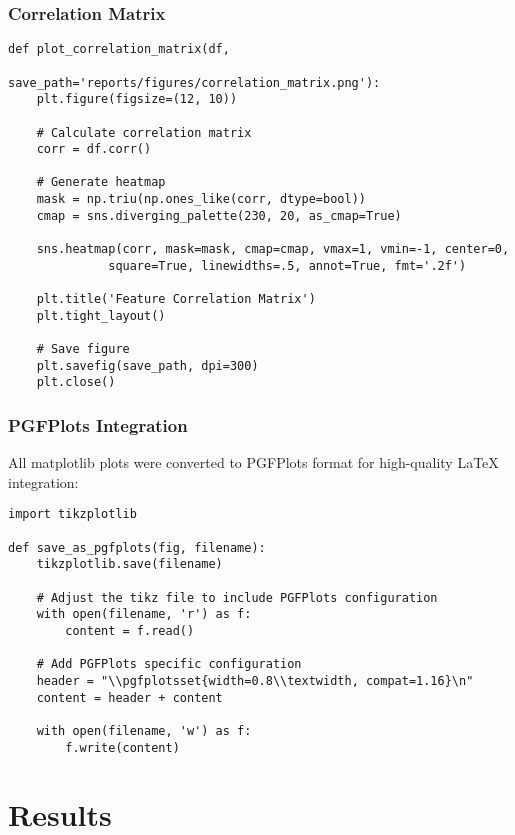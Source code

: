 \documentclass[12pt]{article}
\begin{document}
\subsection{Correlation Matrix}
\label{subsec:correlation_matrix}

\begin{verbatim}
def plot_correlation_matrix(df, 
                          save_path='reports/figures/correlation_matrix.png'):
    plt.figure(figsize=(12, 10))
    
    # Calculate correlation matrix
    corr = df.corr()
    
    # Generate heatmap
    mask = np.triu(np.ones_like(corr, dtype=bool))
    cmap = sns.diverging_palette(230, 20, as_cmap=True)
    
    sns.heatmap(corr, mask=mask, cmap=cmap, vmax=1, vmin=-1, center=0,
              square=True, linewidths=.5, annot=True, fmt='.2f')
    
    plt.title('Feature Correlation Matrix')
    plt.tight_layout()
    
    # Save figure
    plt.savefig(save_path, dpi=300)
    plt.close()
\end{verbatim}

\subsection{PGFPlots Integration}
\label{subsec:pgfplots}

All matplotlib plots were converted to PGFPlots format for high-quality LaTeX integration:

\begin{verbatim}
import tikzplotlib

def save_as_pgfplots(fig, filename):
    tikzplotlib.save(filename)
    
    # Adjust the tikz file to include PGFPlots configuration
    with open(filename, 'r') as f:
        content = f.read()
    
    # Add PGFPlots specific configuration
    header = "\\pgfplotsset{width=0.8\\textwidth, compat=1.16}\n"
    content = header + content
    
    with open(filename, 'w') as f:
        f.write(content)
\end{verbatim}

\chapter{Results}
\label{chap:results}
\end{document}
